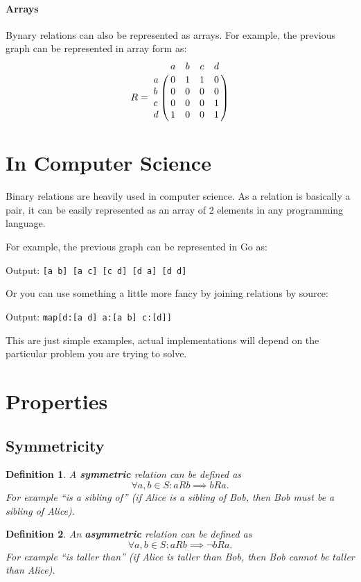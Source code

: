 \documentclass[11pt]{article}
\theoremstyle{plain}
\newtheorem{defn}{Definition}
\theoremstyle{definition}
\begin{document}
\paragraph{Arrays} Bynary relations can also be represented as arrays.
For example,
the previous graph can be represented in array form as:
\begin{equation*}
  R = \bordermatrix{~ & a & b & c & d \cr
  a & 0 & 1 & 1 & 0 \cr
  b & 0 & 0 & 0 & 0 \cr
  c & 0 & 0 & 0 & 1 \cr
d & 1 & 0 & 0 & 1 \cr}
\end{equation*}

\section{In Computer Science}

Binary relations are heavily used in computer science.
As a relation is basically a pair,
it can be easily represented as an array of 2 elements in any programming language.

For example, the previous graph can be represented in Go as:



Output: \verb+[a b] [a c] [c d] [d a] [d d]+

Or you can use something a little more fancy by joining relations by source:



Output: \verb+map[d:[a d] a:[a b] c:[d]]+

This are just simple examples,
actual implementations will depend on the particular problem you are trying to solve.

\section{Properties}

\subsection{Symmetricity}

\begin{defn}
  A \textbf{symmetric} relation can be defined as
  \[ \forall a, b \in S: aRb \implies bRa .\]
  For example ``is a sibling of'' (if Alice is a sibling of Bob, then Bob must be a sibling of Alice).
\end{defn}

\begin{defn}
  An \textbf{asymmetric} relation can be defined as
  \[ \forall a, b \in S: aRb \implies \neg bRa .\]
  For example ``is taller than'' (if Alice is taller than Bob, then Bob cannot be taller than Alice).
\end{defn}
\end{document}
